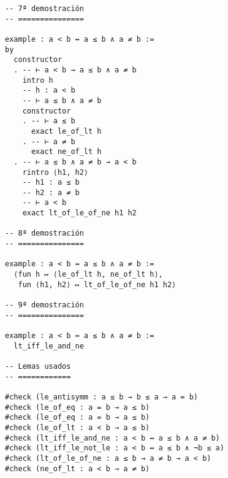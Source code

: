 \begin{verbatim}
-- 7ª demostración
-- ===============

example : a < b ↔ a ≤ b ∧ a ≠ b :=
by
  constructor
  . -- ⊢ a < b → a ≤ b ∧ a ≠ b
    intro h
    -- h : a < b
    -- ⊢ a ≤ b ∧ a ≠ b
    constructor
    . -- ⊢ a ≤ b
      exact le_of_lt h
    . -- ⊢ a ≠ b
      exact ne_of_lt h
  . -- ⊢ a ≤ b ∧ a ≠ b → a < b
    rintro ⟨h1, h2⟩
    -- h1 : a ≤ b
    -- h2 : a ≠ b
    -- ⊢ a < b
    exact lt_of_le_of_ne h1 h2

-- 8ª demostración
-- ===============

example : a < b ↔ a ≤ b ∧ a ≠ b :=
  ⟨fun h ↦ ⟨le_of_lt h, ne_of_lt h⟩,
   fun ⟨h1, h2⟩ ↦ lt_of_le_of_ne h1 h2⟩

-- 9ª demostración
-- ===============

example : a < b ↔ a ≤ b ∧ a ≠ b :=
  lt_iff_le_and_ne

-- Lemas usados
-- ============

#check (le_antisymm : a ≤ b → b ≤ a → a = b)
#check (le_of_eq : a = b → a ≤ b)
#check (le_of_eq : a = b → a ≤ b)
#check (le_of_lt : a < b → a ≤ b)
#check (lt_iff_le_and_ne : a < b ↔ a ≤ b ∧ a ≠ b)
#check (lt_iff_le_not_le : a < b ↔ a ≤ b ∧ ¬b ≤ a)
#check (lt_of_le_of_ne : a ≤ b → a ≠ b → a < b)
#check (ne_of_lt : a < b → a ≠ b)
\end{verbatim}

